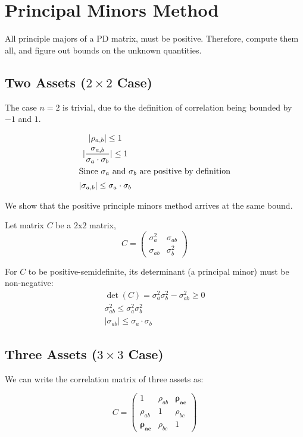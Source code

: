 \documentclass[a4paper]{article}
\begin{document}
\section{Principal Minors Method}\label{spd:sec:main-idea}
All principle majors of a PD matrix, must be positive.
Therefore, compute them all, and figure out bounds on the unknown quantities.

\subsection{Two Assets (\texorpdfstring{$2 \times 2$}{2x2} Case)}\label{spd:subsec:two-asset}
The case $n=2$ is trivial, due to the definition of correlation being bounded by $-1$ and $1$.

\begin{gather*}
|\rho_{a,b}| \leq 1 \\
|\frac{\sigma_{a,b}}{\sigma_a \cdot \sigma_b}| \leq 1 \\
\shortintertext{Since $\sigma_a$ and $\sigma_b$ are positive by definition}
|\sigma_{a,b}| \leq \sigma_a \cdot \sigma_b
\end{gather*}

We show that the positive principle minors method arrives at the same bound. 

Let matrix $C$ be a $2$x$2$ matrix, 
\begin{equation}
C = \begin{pmatrix}
\sigma_a^2 & \sigma_{ab} \\
\sigma_{ab} & \sigma_b^2
\end{pmatrix}\label{spd:eq:equation}
\end{equation}

For $C$ to be positive-semidefinite, its determinant (a principal minor) must be non-negative:
\begin{gather*}
\det(C) = \sigma_a^2 \sigma_b^2 - \sigma_{ab}^2 \geq 0 \\
\sigma_{ab}^2 \leq \sigma_a^2 \sigma_b^2 \\
|\sigma_{ab}| \leq \sigma_a \cdot \sigma_b
\end{gather*}

\subsection{Three Assets (\texorpdfstring{$3 \times 3$}{3x3} Case)}
We can write the correlation matrix of three assets as:

\begin{equation}
C = \begin{pmatrix}
1 & \rho_{ab} & \mathbf{\rho_{ac}} \\
\rho_{ab} & 1 & \rho_{bc} \\
\mathbf{\rho_{ac}} & \rho_{bc} & 1
\end{pmatrix}
\end{equation}
\end{document}
